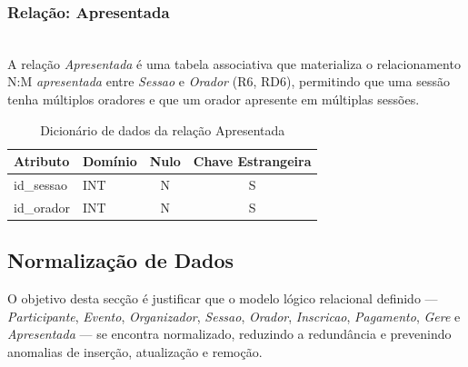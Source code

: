 \documentclass[runningheads]{llncs}
\begin{document}
                \vspace{0.3cm}
                \noindent\begin{minipage}{\textwidth}
                \subsubsection{Relação: Apresentada}\mbox{}\\

                A relação \textit{Apresentada} é uma tabela associativa que materializa o
                relacionamento N:M \textit{apresentada} entre \textit{Sessao} e \textit{Orador}
                (R6, RD6), permitindo que uma sessão tenha múltiplos oradores e que um orador
                apresente em múltiplas sessões.

                \begin{table}[H]
                \centering
                \renewcommand{\arraystretch}{1.4}
                \begin{tabular}{|l|l|c|c|}
                \hline
                \textbf{Atributo} & \textbf{Domínio} & \textbf{Nulo} & \textbf{Chave Estrangeira} \\ \hline
                id\_sessao & INT & N & S \\ \hline
                id\_orador & INT & N & S \\ \hline
                \end{tabular}
                \vspace{0.2cm}
                \caption{Dicionário de dados da relação Apresentada}
                \label{tab:dic_apresentada}
                \end{table}
                \end{minipage}

                \subsection{Normalização de Dados}

                O objetivo desta secção é justificar que o modelo lógico relacional definido
                --- \textit{Participante}, \textit{Evento}, \textit{Organizador}, \textit{Sessao},
                \textit{Orador}, \textit{Inscricao}, \textit{Pagamento}, \textit{Gere}
                e \textit{Apresentada} --- se encontra normalizado, reduzindo a
                redundância e prevenindo anomalias de inserção, atualização e remoção.
\end{document}
